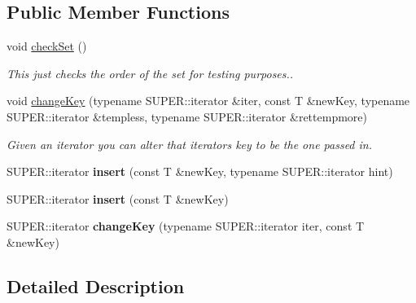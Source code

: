 \subsection*{Public Member Functions}
\begin{DoxyCompactItemize}
\item 
void \hyperlink{classKeyMutableSet_ad5f9c40826ad03b154076abcff2392eb}{check\+Set} ()\hypertarget{classKeyMutableSet_ad5f9c40826ad03b154076abcff2392eb}{}\label{classKeyMutableSet_ad5f9c40826ad03b154076abcff2392eb}

\begin{DoxyCompactList}\small\item\em This just checks the order of the set for testing purposes.. \end{DoxyCompactList}\item 
void \hyperlink{classKeyMutableSet_a89124ba6689e3b0ae9ddf37ee0f7b6d8}{change\+Key} (typename S\+U\+P\+E\+R\+::iterator \&iter, const T \&new\+Key, typename S\+U\+P\+E\+R\+::iterator \&templess, typename S\+U\+P\+E\+R\+::iterator \&rettempmore)
\begin{DoxyCompactList}\small\item\em Given an iterator you can alter that iterator\textquotesingle{}s key to be the one passed in. \end{DoxyCompactList}\item 
S\+U\+P\+E\+R\+::iterator {\bfseries insert} (const T \&new\+Key, typename S\+U\+P\+E\+R\+::iterator hint)\hypertarget{classKeyMutableSet_aaa02c428589f8277c63b98e86a7dfe6e}{}\label{classKeyMutableSet_aaa02c428589f8277c63b98e86a7dfe6e}

\item 
S\+U\+P\+E\+R\+::iterator {\bfseries insert} (const T \&new\+Key)\hypertarget{classKeyMutableSet_a65773fd4224797225b120c383fe115ec}{}\label{classKeyMutableSet_a65773fd4224797225b120c383fe115ec}

\item 
S\+U\+P\+E\+R\+::iterator {\bfseries change\+Key} (typename S\+U\+P\+E\+R\+::iterator iter, const T \&new\+Key)\hypertarget{classKeyMutableSet_a3533764d6280754fa8a56a97ddc55b36}{}\label{classKeyMutableSet_a3533764d6280754fa8a56a97ddc55b36}

\end{DoxyCompactItemize}


\subsection{Detailed Description}
